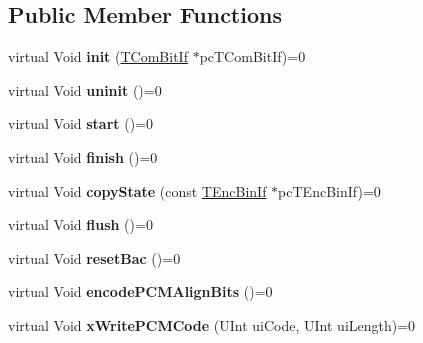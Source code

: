 \subsection*{Public Member Functions}
\begin{DoxyCompactItemize}
\item 
\mbox{\label{class_t_enc_bin_if_a752f1cc438b853f65fc7bcf4eec8337a}} 
virtual Void {\bfseries init} (\hyperlink{class_t_com_bit_if}{T\+Com\+Bit\+If} $\ast$pc\+T\+Com\+Bit\+If)=0
\item 
\mbox{\label{class_t_enc_bin_if_aede5c169103dcec6f21bcb06b38ea502}} 
virtual Void {\bfseries uninit} ()=0
\item 
\mbox{\label{class_t_enc_bin_if_a28cb8f25211981e98d4ba4d96c3b7ad5}} 
virtual Void {\bfseries start} ()=0
\item 
\mbox{\label{class_t_enc_bin_if_af218e797a2274912aa16eb99c42d7956}} 
virtual Void {\bfseries finish} ()=0
\item 
\mbox{\label{class_t_enc_bin_if_a4437b3143b28317345a6916dff2af405}} 
virtual Void {\bfseries copy\+State} (const \hyperlink{class_t_enc_bin_if}{T\+Enc\+Bin\+If} $\ast$pc\+T\+Enc\+Bin\+If)=0
\item 
\mbox{\label{class_t_enc_bin_if_ae8c600280dda64006a7897fb6c4ec275}} 
virtual Void {\bfseries flush} ()=0
\item 
\mbox{\label{class_t_enc_bin_if_a94c19eb101f91990611069ea29e1eb81}} 
virtual Void {\bfseries reset\+Bac} ()=0
\item 
\mbox{\label{class_t_enc_bin_if_a5dd37bc3d329e43ed41f7713ef760cd1}} 
virtual Void {\bfseries encode\+P\+C\+M\+Align\+Bits} ()=0
\item 
\mbox{\label{class_t_enc_bin_if_a4193947ca1032a07c8744d3ddddabe5b}} 
virtual Void {\bfseries x\+Write\+P\+C\+M\+Code} (U\+Int ui\+Code, U\+Int ui\+Length)=0
\item 
\mbox{\label{class_t_enc_bin_if_ade50ed33de8e5fac23e8382682a0feb9}} 

\end{DoxyCompactItemize}
